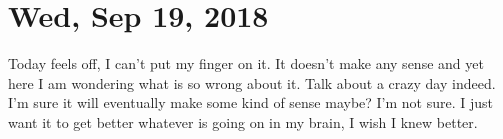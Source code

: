\section{Wed, Sep 19, 2018}

Today feels off, I can't put my finger on it. It doesn't make any sense and yet here
I am wondering what is so wrong about it. Talk about a crazy day indeed. I'm sure it
will eventually make some kind of sense maybe? I'm not sure. I just want it to get
better whatever is going on in my brain, I wish I knew better.